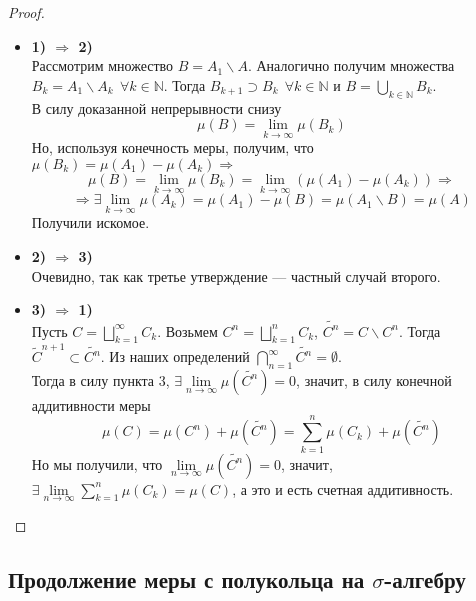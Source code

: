 \begin{proof}
    \ \\
    \begin{itemize}
        \item \textbf{1) $\Longrightarrow$ 2)}\\
        Рассмотрим множество $B = A_1 \backslash A$. Аналогично получим множества $B_k = A_1 \backslash A_k~~\forall k \in \mathbb{N}$. Тогда $B_{k + 1} \supset B_k~~\forall k \in \mathbb{N}$ и $B = \bigcup\limits_{k \in \mathbb{N}}{B_k}$.\\
        В силу доказанной непрерывности снизу
        \[
        \mu(B) = \lim\limits_{k \longrightarrow \infty}{\mu(B_k)}
        \]
        Но, используя конечность меры, получим, что $\mu(B_k) = \mu(A_1) - \mu(A_k) \Longrightarrow$
        \[
        \mu(B) = \lim\limits_{k \longrightarrow \infty}{\mu(B_k)} = \lim\limits_{k \longrightarrow \infty}{(\mu(A_1) - \mu(A_k))} \Longrightarrow
        \]
        \[
        \Longrightarrow \exists \lim\limits_{k \longrightarrow \infty}{\mu(A_k)} = \mu(A_1) - \mu(B) = \mu(A_1 \backslash B) = \mu(A)
        \]
        Получили искомое.
        \item \textbf{2) $\Longrightarrow$ 3)}\\
        Очевидно, так как третье утверждение --- частный случай второго.
        \item \textbf{3) $\Longrightarrow$ 1)}\\
        Пусть $C = \bigsqcup\limits_{k = 1}^{\infty}{C_k}$. Возьмем $C^n = \bigsqcup\limits_{k = 1}^n{C_k}$, $\widetilde{C^n} = C \backslash C^n$. Тогда $\widetilde{C}^{n + 1} \subset \widetilde{C^n}$. Из наших определений $\bigcap\limits_{n = 1}^{\infty}\widetilde{C^n} = \emptyset.$\\
        Тогда в силу пункта 3, $\exists \lim\limits_{n \longrightarrow \infty}{\mu(\widetilde{C^n})} = 0$, значит, в силу конечной аддитивности меры
        \[
        \mu(C) = \mu(C^n) + \mu(\widetilde{C^n}) = \sum\limits_{k = 1}^n{\mu(C_k)} + \mu(\widetilde{C^n})
        \]
        Но мы получили, что $\lim\limits_{n \longrightarrow \infty}{\mu(\widetilde{C^n})} = 0$, значит, $\exists \lim\limits_{n \longrightarrow \infty}{\sum\limits_{k = 1}^n{\mu(C_k)}} = \mu(C)$, а это и есть счетная аддитивность.
    \end{itemize} 
\end{proof}






\subsection{Продолжение меры с полукольца на $\sigma$-алгебру}

